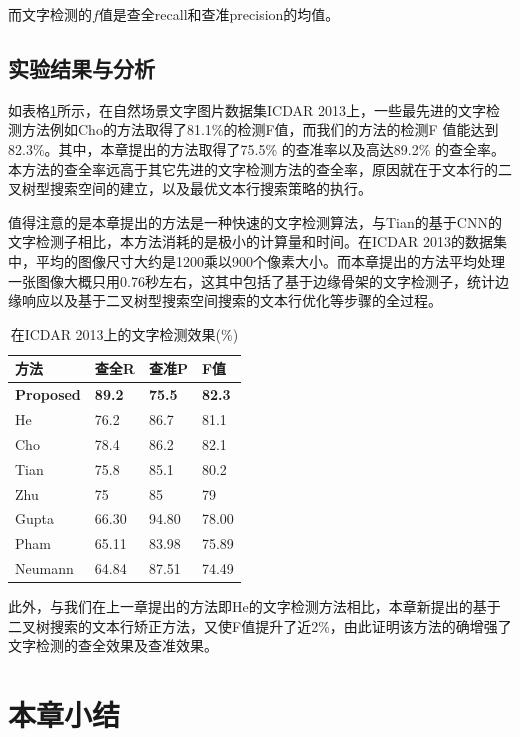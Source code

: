         而文字检测的$f$值是查全recall和查准precision的均值。

        \subsection{实验结果与分析}

        如表格\ref{tab.c4_icdar13}所示，在自然场景文字图片数据集ICDAR 2013上，一些最先进的文字检测方法例如Cho\cite{Cho2016Canny}的方法取得了81.1\%的检测F值，而我们的方法的检测F 值能达到82.3\%。其中，本章提出的方法取得了75.5\% 的查准率以及高达89.2\% 的查全率。本方法的查全率远高于其它先进的文字检测方法的查全率，原因就在于文本行的二叉树型搜索空间的建立，以及最优文本行搜索策略的执行。

        值得注意的是本章提出的方法是一种快速的文字检测算法，与Tian\cite{Tian2016Text}的基于CNN的文字检测子相比，本方法消耗的是极小的计算量和时间。在ICDAR 2013的数据集中，平均的图像尺寸大约是1200乘以900个像素大小。而本章提出的方法平均处理一张图像大概只用0.76秒左右，这其中包括了基于边缘骨架的文字检测子，统计边缘响应以及基于二叉树型搜索空间搜索的文本行优化等步骤的全过程。

        \begin{table}[!h]
        \centering
        \caption{在ICDAR 2013上的文字检测效果(\%)}
        \begin{tabular}{p{}|p{} p{} p{}}
        \hline
        方法 & 查全R & 查准P & F值 \\
        \hline
        \textbf{Proposed} & \textbf{89.2} & \textbf{75.5} & \textbf{82.3}\\
        He\cite{He2017scene} & 76.2 & 86.7 & 81.1 \\
        Cho\cite{Cho2016Canny} & 78.4 & 86.2 & 82.1 \\
        Tian\cite{Tian2016Text} & 75.8 & 85.1 & 80.2 \\
        Zhu\cite{Zhu2016Text} & 75 & 85 & 79 \\
        Gupta\cite{Gupta2016Synthetic} & 66.30 & 94.80 & 78.00 \\
        Pham\cite{Pham2016Robust} & 65.11 & 83.98 & 75.89 \\
        Neumann\cite{Neumann2012Real} & 64.84 & 87.51 & 74.49 \\
        \hline
        \end{tabular}
        \label{tab.c4_icdar13}
        \end{table}

        此外，与我们在上一章提出的方法即He\cite{He2017scene}的文字检测方法相比，本章新提出的基于二叉树搜索的文本行矫正方法，又使F值提升了近2\%，由此证明该方法的确增强了文字检测的查全效果及查准效果。

    

    \section{本章小结}


